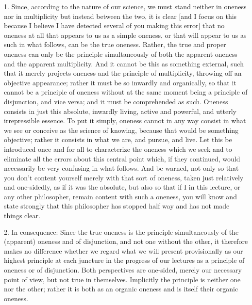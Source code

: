 1. Since, according to the nature of our science,
we must stand neither in oneness nor in multiplicity
but instead between the two, it is clear
[and I focus on this because I believe
I have detected several of you making this error]
that no oneness at all
that appears to us as a simple oneness,
or that will appear to us as such in what follows,
can be the true oneness.
Rather, the true and proper oneness
can only be the principle simultaneously
of both the apparent oneness
and the apparent multiplicity.
And it cannot be this as something external,
such that it merely projects oneness
and the principle of multiplicity,
throwing off an objective appearance;
rather it must be so inwardly and organically,
so that it cannot be a principle of oneness
without at the same moment being
a principle of disjunction, and vice versa;
and it must be comprehended as such.
Oneness consists in just this absolute, inwardly living,
active and powerful, and utterly irrepressible essence.
To put it simply, oneness cannot in any way consist
in what we see or conceive as the science of knowing,
because that would be something objective;
rather it consists in what we are, and pursue, and live.
Let this be introduced once and for all
to characterize the oneness which we seek
and to eliminate all the errors about this central point
which, if they continued, would necessarily
be very confusing in what follows.
And be warned, not only so that you don’t
content yourself merely with that sort of oneness,
taken just relatively and one-sidedly,
as if it was the absolute,
but also so that if I in this lecture,
or any other philosopher,
remain content with such a oneness,
you will know and state strongly that
this philosopher has stopped half way
and has not made things clear.

2. In consequence:
Since the true oneness is
the principle simultaneously of
the (apparent) oneness and of disjunction,
and not one without the other,
it therefore makes no difference
whether we regard what we will present
provisionally as our highest principle
at each juncture in the progress of our lectures
as a principle of oneness or of disjunction.
Both perspectives are one-sided,
merely our necessary point of view,
but not true in themselves.
Implicitly the principle is neither one nor the other;
rather it is both as an organic oneness
and is itself their organic oneness.

